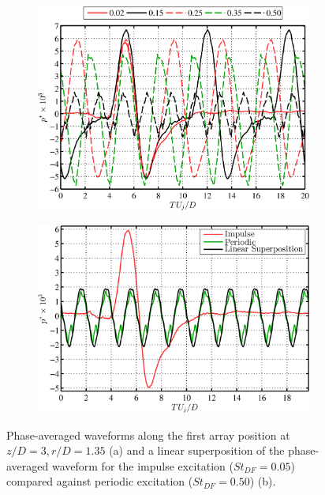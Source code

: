 \begin{figure}
	\centering
	\begin{subfigure}{.5\textwidth}
		\centering
		\includegraphics[width=0.95\linewidth]{Figures/ch3_nearfield_phavg.png}
		\caption{}
		\label{fig:ch3_nearfield_phavg}
	\end{subfigure}%
	\begin{subfigure}{.5\textwidth}
		\centering
		\includegraphics[width=0.95\linewidth]{Figures/ch3_nearfield_linear.png}
		\caption{}
		\label{fig:ch3_nearfield_linear}
	\end{subfigure}
	\caption{Phase-averaged waveforms along the first array position at $z/D = 3, r/D = 1.35$ (a) and a linear superposition of the phase-averaged waveform for the impulse excitation ($St_{DF} = 0.05$) compared against periodic excitation ($St_{DF} = 0.50$) (b).}
	\label{fig:ch3_nearfield}
\end{figure}

